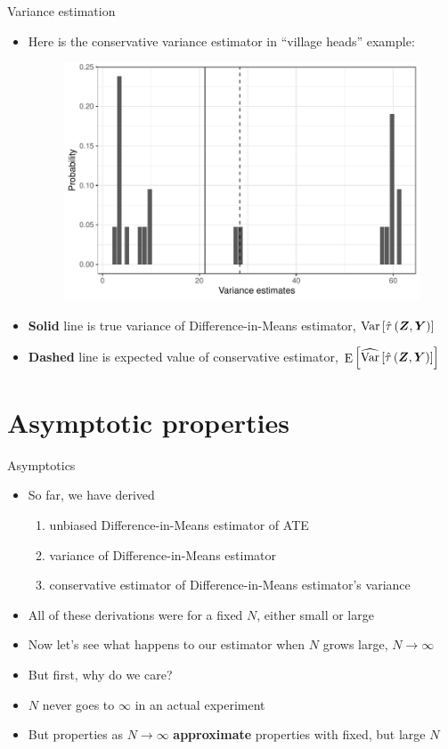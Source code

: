 \documentclass[table, xcolor = {dvipsnames}, 9pt]{beamer}
\theoremstyle{plain}
\DeclareMathOperator{\E}{\rm{E}}
\DeclareMathOperator{\Var}{\rm{Var}}
\begin{document}
\begin{frame}{Variance estimation} 
\vfill
\begin{itemize} \vfill
\item Here is the conservative variance estimator in ``village heads'' example: \vfill
\begin{figure}[H]
\includegraphics[width=0.8\linewidth]{cra_var_est_dist_plot.pdf}
\end{figure} \vfill
\item[] \small \textbf{Solid} line is true variance of Difference-in-Means estimator, $\Var\left[\hat{\tau}\left(\bm{Z}, \bm{Y}\right)\right]$  \vfill
\item[] \textbf{Dashed} line is expected value of conservative estimator, $\E\left[\widehat{\Var}\left[\hat{\tau}\left(\bm{Z}, \bm{Y}\right)\right]\right]$ \normalsize \vfill
\end{itemize} \vfill
\end{frame}
\section{Asymptotic properties}
\begin{frame}{Asymptotics}
\vfill
\begin{itemize} \vfill
\item So far, we have derived\vfill
\begin{enumerate} \vfill
\item unbiased Difference-in-Means estimator of ATE \vfill
\item variance of Difference-in-Means estimator \vfill
\item conservative estimator of Difference-in-Means estimator's variance
\vfill\end{enumerate} \vfill \pause
\item All of these derivations were for a fixed $N$, either small or large \vfill
\item Now let's see what happens to our estimator when $N$ grows large, $N \to \infty$ \vfill
\item But first, why do we care? \pause \vfill
\item[] $N$ never goes to $\infty$ in an actual experiment \vfill
\item[] But properties as $N \to \infty$ \textbf{approximate} properties with fixed, but large $N$ \vfill
\end{itemize} \vfill
\end{frame}
\end{document}
